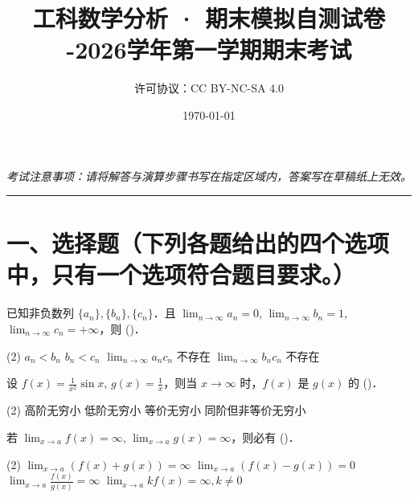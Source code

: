 \documentclass[
  a4paper,
  11pt,
  title in boldface,
  theorem in new line,
  remove problem qed
]{homework}
\title{工科数学分析 · 期末模拟自测试卷 \\
  \large\normalfont 2025-2026学年第一学期期末考试}
\author{\small\normalfont 许可协议：CC BY-NC-SA 4.0}
\date{\today}
\begin{document}
\maketitle

\begin{center}
  \small\itshape 考试注意事项：请将解答与演算步骤书写在指定区域内，答案写在草稿纸上无效。
\end{center}
\vspace{0.5em}\hrule\vspace{1.2em}
\section*{一、选择题（下列各题给出的四个选项中，只有一个选项符合题目要求。）}

\begin{problem}
  已知非负数列 $\{a_n\}, \{b_n\}, \{c_n\}$．且 $\lim_{n \to \infty} a_n = 0$, $\lim_{n \to \infty} b_n = 1$, $\lim_{n \to \infty} c_n = +\infty$，则 (\quad)．

  \begin{tasks}(2)
  \task $a_n < b_n$
  \task $b_n < c_n$
  \task $\lim_{n \to \infty} a_n c_n$ 不存在
  \task $\lim_{n \to \infty} b_n c_n$ 不存在
\end{tasks}
\end{problem}

\begin{problem}
  设 $f(x) = \frac{1}{x^2} \sin x$, $g(x) = \frac{1}{x}$，则当 $x \to \infty$ 时，$f(x)$ 是 $g(x)$ 的 (\quad)．

  \begin{tasks}(2)
  \task 高阶无穷小
  \task 低阶无穷小
  \task 等价无穷小
  \task 同阶但非等价无穷小
\end{tasks}
\end{problem}

\begin{problem}
  若 $\lim_{x \to a} f(x) = \infty$, $\lim_{x \to a} g(x) = \infty$，则必有 (\quad)．

  \begin{tasks}(2)
  \task $\lim_{x \to a} (f(x) + g(x)) = \infty$
  \task $\lim_{x \to a} (f(x) - g(x)) = 0$
  \task $\lim_{x \to a} \frac{f(x)}{g(x)} = \infty$
  \task $\lim_{x \to a} k f(x) = \infty, k \ne 0$
\end{tasks}
\end{problem}
\end{document}
